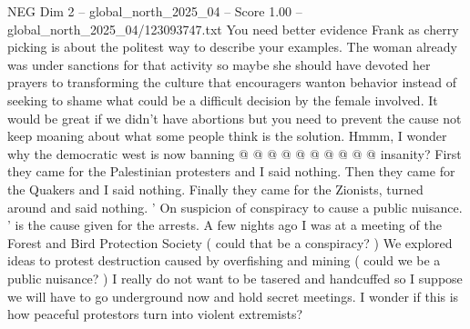 \begin{textsample}{NEG Dim 2 – global\_north\_2025\_04 – Score 1.00 – global\_north\_2025\_04/123093747.txt}
You need better evidence Frank as cherry picking is about the politest way to describe your examples.
The woman already was under sanctions for that activity so maybe she should have devoted her prayers to transforming the culture that encouragers wanton behavior instead of seeking to shame what could be a difficult decision by the female involved.
It would be great if we didn't have abortions but you need to prevent the cause not keep moaning about what some people think is the solution.
Hmmm, I wonder why the democratic west is now banning @ @ @ @ @ @ @ @ @ @ insanity?
First they came for the Palestinian protesters and I said nothing.
Then they came for the Quakers and I said nothing.
Finally they came for the Zionists, turned around and said nothing. ' On suspicion of conspiracy to cause a public nuisance. ' is the cause given for the arrests.
A few nights ago I was at a meeting of the Forest and Bird Protection Society ( could that be a conspiracy? ) We explored ideas to protest destruction caused by overfishing and mining ( could we be a public nuisance? ) I really do not want to be tasered and handcuffed so I suppose we will have to go underground now and hold secret meetings.
I wonder if this is how peaceful protestors turn into violent extremists?

\end{textsample}
